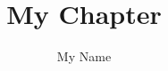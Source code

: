 \documentclass[journal,twocolumn,a4paper,10pt]{../Setup/IEEEtran}
\begin{document}
\def\localpath{.}
  
\title{My Chapter}
\author{My Name}
%
\maketitle
 
\begin{abstract}

\end{abstract}





 

 
\end{document}
